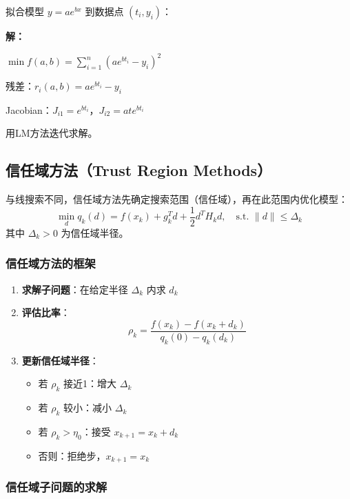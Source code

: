 \begin{example}[曲线拟合]
拟合模型 $y = ae^{bx}$ 到数据点 $(t_i, y_i)$：

\textbf{解：}

$\min f(a,b) = \sum_{i=1}^{n} (ae^{bt_i} - y_i)^2$

残差：$r_i(a,b) = ae^{bt_i} - y_i$

Jacobian：$J_{i1} = e^{bt_i}$，$J_{i2} = ate^{bt_i}$

用LM方法迭代求解。
\end{example}

\subsection{信任域方法（Trust Region Methods）}\label{sec:trust-region}

\begin{conceptbox}[信任域方法]
与线搜索不同，信任域方法先确定搜索范围（信任域），再在此范围内优化模型：
\[
\min_d q_k(d) = f(x_k) + g_k^T d + \frac{1}{2}d^T H_k d, \quad \text{s.t. } \|d\| \leq \Delta_k
\]
其中 $\Delta_k > 0$ 为信任域半径。
\end{conceptbox}

\subsubsection{信任域方法的框架}

\begin{enumerate}
    \item \textbf{求解子问题}：在给定半径 $\Delta_k$ 内求 $d_k$
    \item \textbf{评估比率}：
    \[
    \rho_k = \frac{f(x_k) - f(x_k + d_k)}{q_k(0) - q_k(d_k)}
    \]
    \item \textbf{更新信任域半径}：
    \begin{itemize}
        \item 若 $\rho_k$ 接近1：增大 $\Delta_k$
        \item 若 $\rho_k$ 较小：减小 $\Delta_k$
        \item 若 $\rho_k > \eta_0$：接受 $x_{k+1} = x_k + d_k$
        \item 否则：拒绝步，$x_{k+1} = x_k$
    \end{itemize}
\end{enumerate}

\subsubsection{信任域子问题的求解}

